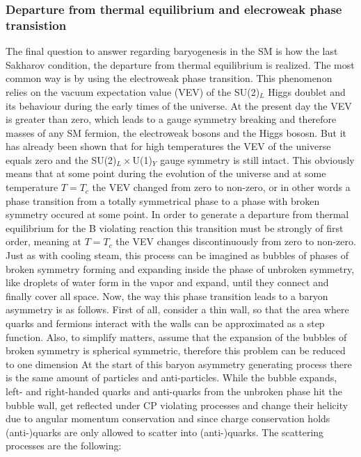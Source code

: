 \subsubsection{Departure from thermal equilibrium and elecroweak phase transistion}
 The final question to answer regarding baryogenesis in the SM is how the last Sakharov condition, the departure from thermal equilibrium is realized. The most common way is by using the electroweak phase transition. \newline\indent
This phenomenon relies on the vacuum expectation value (VEV) of the SU(2)$_L$ Higgs doublet and its behaviour during the early times of the universe. At the present day the VEV is greater than zero, which leads to a gauge symmetry breaking and therefore masses of any SM fermion, the electroweak bosons and the Higgs bososn. But it has already been shown \cite[p. 21]{Bernreuther:2002uj} that for high temperatures the VEV of the universe equals zero and the SU(2)$_L\times$U(1)$_Y$ gauge symmetry is still intact. This obviously means that at some point during the evolution of the universe and at some temperature $T=T_c$ the VEV changed from zero to non-zero, or in other words a phase transition from a totally symmetrical phase to a phase with broken symmetry occured at some point. In order to generate a departure from thermal equilibrium for the B violating reaction this transition must be strongly of first order, meaning at $T=T_c$ the VEV changes discontinuously from zero to non-zero. \newline\indent
Just as with cooling steam, this process can be imagined as bubbles of phases of broken symmetry forming and expanding inside the phase of unbroken symmetry, like droplets of water form in the vapor and expand, until they connect and finally cover all space. Now, the way this phase transition leads to a baryon asymmetry is as follows. \newline\indent
First of all, consider a thin wall, so that the area where quarks and fermions interact with the walls can be approximated as a step function. Also, to simplify matters, assume that the expansion of the bubbles of broken symmetry is spherical symmetric, therefore this problem can be reduced to one dimension\cite[p. 33]{Bernreuther:2002uj} \newline\indent
At the start of this baryon asymmetry generating process there is the same amount of particles and anti-particles. \newline\indent
While the bubble expands, left- and right-handed quarks and anti-quarks from the unbroken phase hit the bubble wall, get reflected under CP violating processes and change their helicity due to angular momentum conservation and since charge conservation holds (anti-)quarks are only allowed to scatter into (anti-)quarks. The scattering processes are the following:

